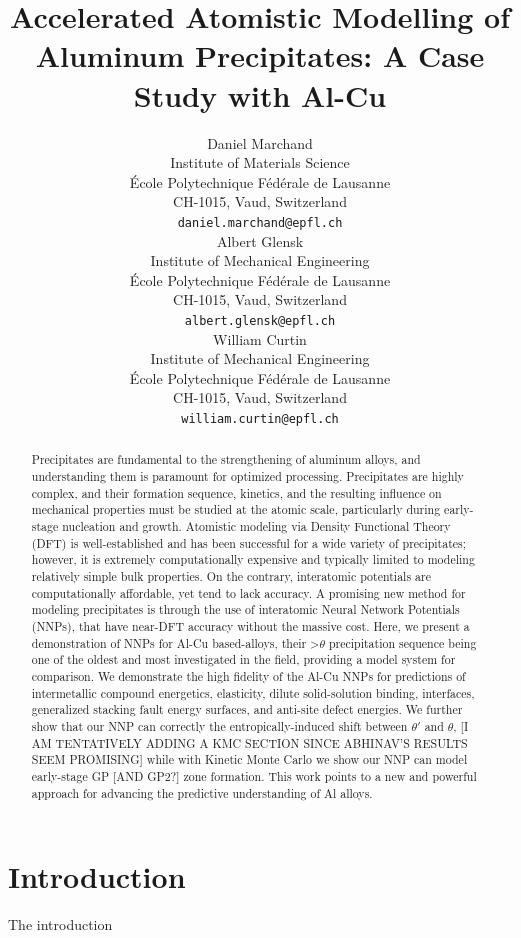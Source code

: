 \documentclass{article}
\title{Accelerated Atomistic Modelling of Aluminum Precipitates: A Case Study with Al-Cu}
\author{
 Daniel Marchand \\
  Institute of Materials Science \\
  École Polytechnique Fédérale de Lausanne \\
  CH-1015, Vaud, Switzerland \\
  \texttt{daniel.marchand@epfl.ch} \\
   \And
 Albert Glensk \\
  Institute of Mechanical Engineering \\
  École Polytechnique Fédérale de Lausanne \\
  CH-1015, Vaud, Switzerland \\
  \texttt{albert.glensk@epfl.ch} \\
  \And
 William Curtin \\
  Institute of Mechanical Engineering \\
  École Polytechnique Fédérale de Lausanne \\
  CH-1015, Vaud, Switzerland \\
  \texttt{william.curtin@epfl.ch} \\
}
\begin{document}
\maketitle
\begin{abstract}
Precipitates are fundamental to the strengthening of aluminum alloys, and understanding them is paramount for optimized processing. Precipitates are highly complex, and their formation sequence, kinetics, and the resulting influence on mechanical properties must be studied at the atomic scale, particularly during early-stage nucleation and growth.
Atomistic modeling via Density Functional Theory (DFT) is well-established and has been successful for a wide variety of precipitates; however, it is extremely computationally expensive and typically limited to modeling relatively simple bulk properties. On the contrary, interatomic potentials are computationally affordable, yet tend to lack accuracy. A promising new method for modeling precipitates is through the use of interatomic Neural Network Potentials (NNPs), that have near-DFT accuracy without the massive cost. 
Here, we present a demonstration of NNPs for Al-Cu based-alloys, their >$\theta$ precipitation sequence being one of the oldest and most investigated in the field, providing a model system for comparison. We demonstrate the high fidelity of the Al-Cu NNPs for predictions of intermetallic compound energetics, elasticity, dilute solid-solution binding, interfaces, generalized stacking fault energy surfaces, and anti-site defect energies. We further show that our NNP can correctly the entropically-induced shift between $\theta'$ and $\theta$, [I AM TENTATIVELY ADDING A KMC SECTION SINCE ABHINAV'S RESULTS SEEM PROMISING] while with Kinetic Monte Carlo we show our NNP can model early-stage GP [AND GP2?] zone formation. This work points to a new and powerful approach for advancing the predictive understanding of Al alloys. 
\end{abstract}




\section{Introduction}
The introduction  \cite{Kobayashi2017}


  
\end{document}
